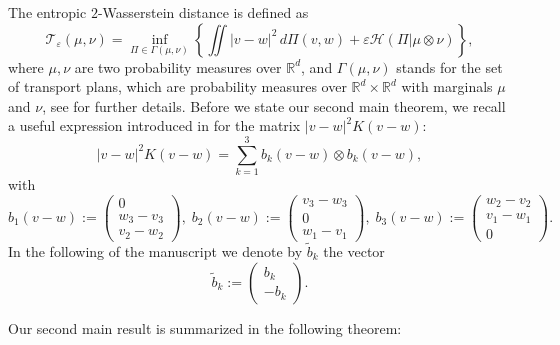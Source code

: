 \documentclass[11pt]{amsart}
\numberwithin{equation}{section}
\begin{document}
The entropic $2$-Wasserstein distance is defined as
\begin{equation}\label{eq:defn_W2}
  \mathcal T_\varepsilon(\mu,\nu) = \inf_{\Pi\in \Gamma(\mu,\nu)} 
  \left\{ \iint|v-w|^2 \, d\Pi(v,w) + \varepsilon\mathcal H(\Pi|\mu\otimes \nu)\right\},
\end{equation}
where $\mu,\nu$ are two probability measures over $\mathbb{R}^d$, and $\Gamma(\mu,\nu)$ stands for the set of transport plans, which are probability measures over $\mathbb{R}^d\times \mathbb{R}^d$ with marginals $\mu$ and $\nu$, see \cite{gigli2020benamou} for further details. Before we state our second main theorem, we recall a useful expression introduced in \cite{GS24}  for the matrix $\vert v-w\vert^2 K(v-w)$: 
$$
\vert v-w\vert^2 K(v-w) = \sum_{k=1}^3 b_k(v-w) \otimes  b_k(v-w),
$$
with 
  \begin{equation*}
    b_{1}(v-w):=\begin{pmatrix}0\\
      w_{3}-v_{3}\\
      v_{2}-w_{2}
      \end{pmatrix},\; b_{2}(v-w):=\begin{pmatrix}v_{3}-w_{3}\\
      0\\
      w_{1}-v_{1}
      \end{pmatrix},\; b_{3}(v-w):=\begin{pmatrix}w_{2}-v_{2}\\
      v_{1}-w_{1}\\
      0
      \end{pmatrix}.
  \end{equation*}
In the following of the manuscript we denote by $\tilde b_k$ the vector 
$$
      \tilde b_k := \begin{pmatrix}
        b_k \\ -b_k
      \end{pmatrix} . 
      $$ %





Our second main result is summarized in the following theorem: 

\end{document}
